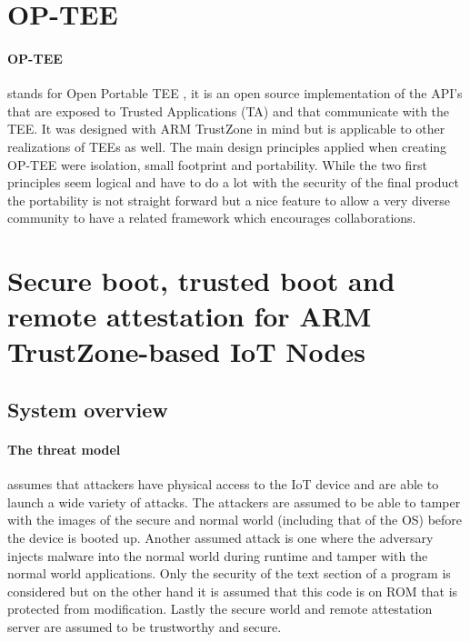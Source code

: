 \documentclass{report}
\begin{document}
\section{OP-TEE}

\paragraph*{OP-TEE}
stands for Open Portable TEE \cite{OP-TEE}, it is an open source implementation of the API's that are exposed to Trusted Applications (TA) and that communicate with the TEE. It was designed with ARM TrustZone in mind but is applicable to other realizations of TEEs as well. The main design principles applied when creating OP-TEE were isolation, small footprint and portability. While the two first principles seem logical and have to do a lot with the security of the final product the portability is not straight forward but a nice feature to allow a very diverse community to have a related framework which encourages collaborations.

\section{Secure boot, trusted boot and remote attestation for ARM TrustZone-based IoT Nodes \cite{LingZhen2021Sbtb}}

\subsection*{System overview}

\paragraph*{The threat model}
assumes that attackers have physical access to the IoT device and are able to launch a wide variety of attacks. The attackers are assumed to be able to tamper with the images of the secure and normal world (including that of the OS) before the device is booted up. Another assumed attack is one where the adversary injects malware into the normal world during runtime and tamper with the normal world applications. Only the security of the text section of a program is considered but on the other hand it is assumed that this code is on ROM that is protected from modification. Lastly the secure world and remote attestation server are assumed to be trustworthy and secure.
\end{document}
